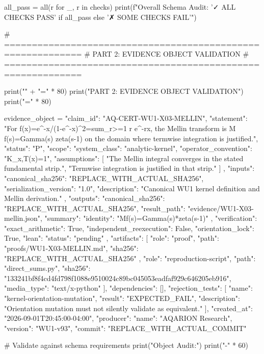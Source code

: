 all_pass = all(r for _, r in checks)
print(f"\n  Overall Schema Audit: {'✓ ALL CHECKS PASS' if all_pass else '✗ SOME CHECKS FAIL'}")

# ============================================================
# PART 2: EVIDENCE OBJECT VALIDATION
# ============================================================

print("\n" + "=" * 80)
print("PART 2: EVIDENCE OBJECT VALIDATION")
print("=" * 80)

evidence_object = {
    "claim_id": "AQ-CERT-WU1-X03-MELLIN",
    "statement": "For f(x)=e^{-x}/(1-e^{-x})^2=sum_{r>=1} r e^{-rx}, the Mellin transform is M f(s)=Gamma(s) zeta(s-1) on the domain where termwise integration is justified.",
    "status": "P",
    "scope": {
        "system_class": "analytic-kernel",
        "operator_convention": "K_x,T(x)=1",
        "assumptions": [
            "The Mellin integral converges in the stated fundamental strip.",
            "Termwise integration is justified in that strip."
        ]
    },
    "inputs": {
        "canonical_sha256": "REPLACE_WITH_ACTUAL_SHA256",
        "serialization_version": "1.0",
        "description": "Canonical WU1 kernel definition and Mellin derivation."
    },
    "outputs": {
        "canonical_sha256": "REPLACE_WITH_ACTUAL_SHA256",
        "result_path": "evidence/WU1-X03-mellin.json",
        "summary": {
            "identity": "Mf(s)=Gamma(s)*zeta(s-1)"
        }
    },
    "verification": {
        "exact_arithmetic": True,
        "independent_reexecution": False,
        "orientation_lock": True,
        "lean": {
            "status": "pending"
        }
    },
    "artifacts": [
        {
            "role": "proof",
            "path": "proofs/WU1-X03-MELLIN.md",
            "sha256": "REPLACE_WITH_ACTUAL_SHA256"
        },
        {
            "role": "reproduction-script",
            "path": "direct_sums.py",
            "sha256": "133241bf8f4cd4fd798f1088e9510024c89bc045053eadfaf929c646205eb916",
            "media_type": "text/x-python"
        }
    ],
    "dependencies": [],
    "rejection_tests": [
        {
            "name": "kernel-orientation-mutation",
            "result": "EXPECTED_FAIL",
            "description": "Orientation mutation must not silently validate as equivalent."
        }
    ],
    "created_at": "2026-09-01T20:45:00-04:00",
    "producer": {
        "name": "AQARION Research",
        "version": "WU1-v93",
        "commit": "REPLACE_WITH_ACTUAL_COMMIT"
    }
}

# Validate against schema requirements
print("\nEvidence Object Audit:")
print("-" * 60)

